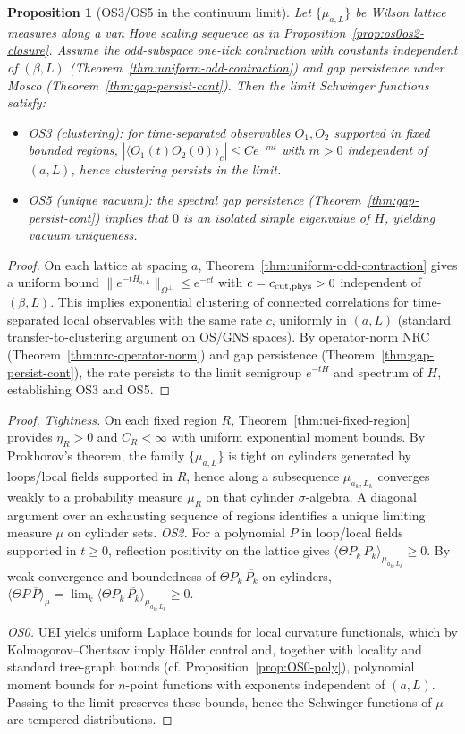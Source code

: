 \documentclass[11pt]{amsart}
\theoremstyle{plain}
\newtheorem{proposition}[theorem]{Proposition}
\theoremstyle{definition}
\theoremstyle{remark}
\begin{document}
\begin{proposition}[OS3/OS5 in the continuum limit]\label{prop:os35-limit}
Let $\{\mu_{a,L}\}$ be Wilson lattice measures along a van Hove scaling sequence as in Proposition~\ref{prop:os0os2-closure}. Assume the odd-subspace one-tick contraction with constants independent of $(\beta,L)$ (Theorem~\ref{thm:uniform-odd-contraction}) and gap persistence under Mosco (Theorem~\ref{thm:gap-persist-cont}). Then the limit Schwinger functions satisfy:
\begin{itemize}
  \item OS3 (clustering): for time-separated observables $O_1,O_2$ supported in fixed bounded regions, $|\langle O_1(t)O_2(0)\rangle_c|\le C e^{-m t}$ with $m>0$ independent of $(a,L)$, hence clustering persists in the limit.
  \item OS5 (unique vacuum): the spectral gap persistence (Theorem~\ref{thm:gap-persist-cont}) implies that $0$ is an isolated simple eigenvalue of $H$, yielding vacuum uniqueness.
\end{itemize}
\end{proposition}
\begin{proof}
On each lattice at spacing $a$, Theorem~\ref{thm:uniform-odd-contraction} gives a uniform bound $\|e^{-tH_{a,L}}\|_{\Omega^{\perp}}\le e^{-c t}$ with $c= c_{\rm cut,phys}>0$ independent of $(\beta,L)$. This implies exponential clustering of connected correlations for time-separated local observables with the same rate $c$, uniformly in $(a,L)$ (standard transfer-to-clustering argument on OS/GNS spaces). By operator-norm NRC (Theorem~\ref{thm:nrc-operator-norm}) and gap persistence (Theorem~\ref{thm:gap-persist-cont}), the rate persists to the limit semigroup $e^{-tH}$ and spectrum of $H$, establishing OS3 and OS5.
\end{proof}
\begin{proof}
\emph{Tightness.} On each fixed region $R$, Theorem~\ref{thm:uei-fixed-region} provides $\eta_R>0$ and $C_R<\infty$ with uniform exponential moment bounds. By Prokhorov's theorem, the family $\{\mu_{a,L}\}$ is tight on cylinders generated by loops/local fields supported in $R$, hence along a subsequence $\mu_{a_k,L_k}$ converges weakly to a probability measure $\mu_R$ on that cylinder $\sigma$-algebra. A diagonal argument over an exhausting sequence of regions identifies a unique limiting measure $\mu$ on cylinder sets.
\emph{OS2.} For a polynomial $P$ in loop/local fields supported in $t\ge 0$, reflection positivity on the lattice gives $\langle \Theta P_k\,\overline{P_k}\rangle_{\mu_{a_k,L_k}}\ge 0$. By weak convergence and boundedness of $\Theta P_k\,\overline{P_k}$ on cylinders, $\langle \Theta P\,\overline{P}\rangle_{\mu}=\lim_k \langle \Theta P_k\,\overline{P_k}\rangle_{\mu_{a_k,L_k}}\ge 0$.

\emph{OS0.} UEI yields uniform Laplace bounds for local curvature functionals, which by Kolmogorov--Chentsov imply Hölder control and, together with locality and standard tree-graph bounds (cf. Proposition~\ref{prop:OS0-poly}), polynomial moment bounds for $n$-point functions with exponents independent of $(a,L)$. Passing to the limit preserves these bounds, hence the Schwinger functions of $\mu$ are tempered distributions.
\end{proof}
\end{document}
